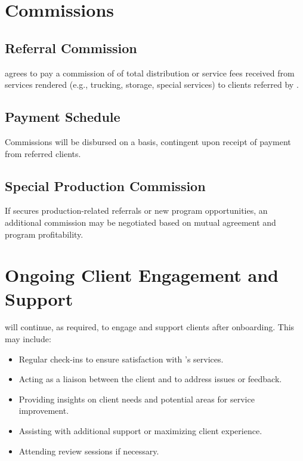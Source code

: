 \documentclass[12pt]{article}
\begin{document}
\section{Commissions}
\label{sec:commissions}

\subsection{Referral Commission}
\partyBshort{} agrees to pay \partyAshort{} a commission of \commissionRate{} of total distribution or service fees received from services rendered (e.g., trucking, storage, special services) to clients referred by \partyAshort{}.

\subsection{Payment Schedule}
Commissions will be disbursed on a \paymentSchedule{} basis, contingent upon receipt of payment from referred clients.

\subsection{Special Production Commission}
If \partyAshort{} secures production-related referrals or new program opportunities, an additional commission may be negotiated based on mutual agreement and program profitability.

\section{Ongoing Client Engagement and Support}
\partyAshort{} will continue, as required, to engage and support clients after onboarding. This may include:
\begin{itemize}
  \item Regular check-ins to ensure satisfaction with \partyBshort{}’s services.
  \item Acting as a liaison between the client and \partyBshort{} to address issues or feedback.
  \item Providing insights on client needs and potential areas for service improvement.
  \item Assisting with additional support or maximizing client experience.
  \item Attending review sessions if necessary.
\end{itemize}
\end{document}
